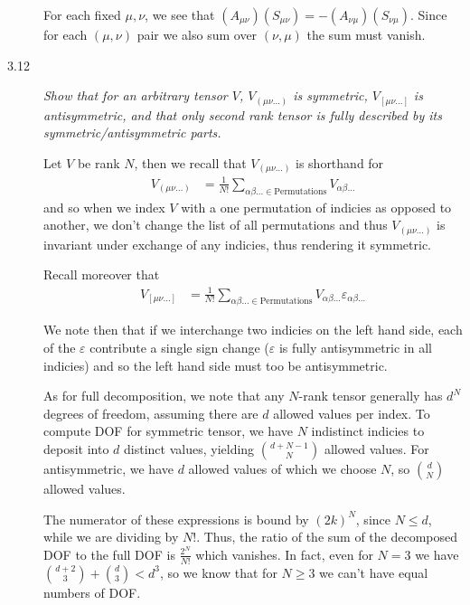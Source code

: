 \documentclass[12pt]{report}
\begin{document}
\begin{description}
        For each fixed $\mu, \nu$, we see that $(A_{\mu\nu})(S_{\mu\nu}) =
        - (A_{\nu\mu})(S_{\nu\mu})$. Since for each $(\mu, \nu)$ pair we also
        sum over $(\nu, \mu)$ the sum must vanish.

    \item[3.12] \emph{Show that for an arbitrary tensor $V$, $V_{(\mu\nu\dots)}$
        is symmetric, $V_{[\mu\nu\dots]}$ is antisymmetric, and that only second
        rank tensor is fully described by its symmetric/antisymmetric parts.}

        Let $V$ be rank $N$, then we recall that $V_{(\mu\nu\dots)}$ is
        shorthand for
        \begin{align*}
            V_{(\mu\nu\dots)} &= \frac{1}{N!}
                \sum\limits_{\alpha\beta\dots \in\text{Permutations}}^{}
                V_{\alpha\beta\dots}
        \end{align*}
        and so when we index $V$ with a one permutation of indicies as opposed
        to another, we don't change the list of all permutations and thus
        $V_{(\mu\nu\dots)}$ is invariant under exchange of any indicies, thus
        rendering it symmetric.

        Recall moreover that
        \begin{align*}
            V_{[\mu\nu\dots]} &= \frac{1}{N!}
                \sum\limits_{\alpha\beta\dots \in\text{Permutations}}^{}
                V_{\alpha\beta\dots}\varepsilon_{\alpha\beta\dots}
        \end{align*}

        We note then that if we interchange two indicies on the left hand side,
        each of the $\varepsilon$ contribute a single sign change ($\varepsilon$
        is fully antisymmetric in all indicies) and so the left hand side must
        too be antisymmetric.

        As for full decomposition, we note that any $N$-rank tensor generally
        has $d^N$ degrees of freedom, assuming there are $d$ allowed values per
        index. To compute DOF for symmetric tensor, we have $N$ indistinct
        indicies to deposit into $d$ distinct values, yielding
        $\binom{d + N - 1}{N}$ allowed values. For antisymmetric, we have
        $d$ allowed values of which we choose $N$, so $\binom{d}{N}$ allowed
        values.

        The numerator of these expressions is bound by $(2k)^N$, since
        $N \leq d$, while we are dividing by $N!$. Thus, the ratio of the sum of
        the decomposed DOF to the full DOF is $\frac{2^N}{N!}$ which vanishes.
        In fact, even for $N=3$ we have $\binom{d+2}{3} + \binom{d}{3} < d^3$,
        so we know that for $N \geq 3$ we can't have equal numbers of DOF\@.


\end{description}
\end{document}
